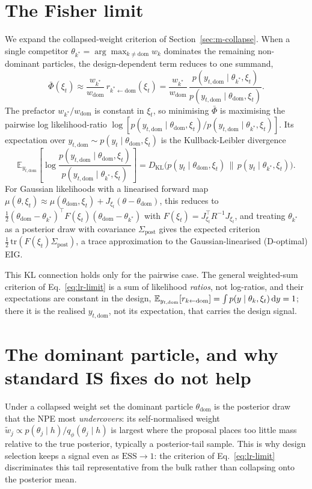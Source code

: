 \section{The Fisher limit}
We expand the collapsed-weight criterion of Section~\ref{sec:m-collapse}. When a single
competitor $\theta_{k^\ast}=\arg\max_{k\ne\mathrm{dom}}w_k$ dominates the remaining
non-dominant particles, the design-dependent term reduces to one summand,
\begin{equation}
\label{eq:pairwise}
\bar\Phi(\xi_t)\approx\frac{w_{k^\ast}}{w_{\mathrm{dom}}}\,r_{k^\ast\leftarrow\mathrm{dom}}(\xi_t)
=\frac{w_{k^\ast}}{w_{\mathrm{dom}}}\,\frac{p(y_{t,\mathrm{dom}}\mid\theta_{k^\ast},\xi_t)}{p(y_{t,\mathrm{dom}}\mid\theta_{\mathrm{dom}},\xi_t)} .
\end{equation}
The prefactor $w_{k^\ast}/w_{\mathrm{dom}}$ is constant in $\xi_t$, so minimising
$\bar\Phi$ is maximising the pairwise log likelihood-ratio
$\log[p(y_{t,\mathrm{dom}}\mid\theta_{\mathrm{dom}},\xi_t)/p(y_{t,\mathrm{dom}}\mid\theta_{k^\ast},\xi_t)]$.
Its expectation over $y_{t,\mathrm{dom}}\sim p(y_t\mid\theta_{\mathrm{dom}},\xi_t)$ is the
Kullback-Leibler divergence
\[
\mathbb{E}_{y_{t,\mathrm{dom}}}\!\left[\log\frac{p(y_{t,\mathrm{dom}}\mid\theta_{\mathrm{dom}},\xi_t)}{p(y_{t,\mathrm{dom}}\mid\theta_{k^\ast},\xi_t)}\right]
= D_{\mathrm{KL}}\!\big(p(y_t\mid\theta_{\mathrm{dom}},\xi_t)\,\|\,p(y_t\mid\theta_{k^\ast},\xi_t)\big) .
\]
For Gaussian likelihoods with a linearised forward map
$\mu(\theta,\xi_t)\approx\mu(\theta_{\mathrm{dom}},\xi_t)+J_{\xi_t}(\theta-\theta_{\mathrm{dom}})$,
this reduces to
$\tfrac12(\theta_{\mathrm{dom}}-\theta_{k^\ast})^\top F(\xi_t)(\theta_{\mathrm{dom}}-\theta_{k^\ast})$
with $F(\xi_t)=J_{\xi_t}^\top R^{-1}J_{\xi_t}$, and treating $\theta_{k^\ast}$ as a
posterior draw with covariance $\Sigma_{\mathrm{post}}$ gives the expected criterion
$\tfrac12\,\mathrm{tr}(F(\xi_t)\Sigma_{\mathrm{post}})$, a trace approximation to the
Gaussian-linearised (D-optimal) EIG.

This KL connection holds only for the pairwise case. The general weighted-sum criterion
of Eq.~\eqref{eq:lr-limit} is a sum of likelihood \emph{ratios}, not log-ratios, and
their expectations are constant in the design,
$\mathbb{E}_{y_{t,\mathrm{dom}}}[r_{k\leftarrow\mathrm{dom}}]=\int p(y\mid\theta_k,\xi_t)\,\mathrm{d} y=1$;
there it is the realised $y_{t,\mathrm{dom}}$, not its expectation, that carries the
design signal.

\section{The dominant particle, and why standard IS fixes do not help}
\label{app:domparticle}
Under a collapsed weight set the dominant particle $\theta_{\mathrm{dom}}$ is the
posterior draw that the NPE most \emph{undercovers}: its self-normalised weight
$\tilde w_j\propto p(\theta_j\mid h)/q_\phi(\theta_j\mid h)$ is largest where the proposal
places too little mass relative to the true posterior, typically a posterior-tail
sample. This is why design selection keeps a signal even as $\mathrm{ESS}\to1$: the
criterion of Eq.~\eqref{eq:lr-limit} discriminates this tail representative from the
bulk rather than collapsing onto the posterior mean.

